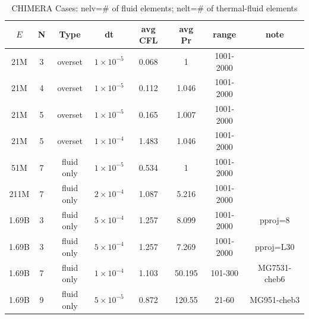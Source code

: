 

\begin{table}
\centering
\caption{CHIMERA Cases: nelv=\# of fluid elements; nelt=\# of thermal-fluid elements}
\begin{tabular}{|c|c|c|c|c|c|c|c|}
\hline
\textbf{$E$} & \textbf{N} & \textbf{Type} & \textbf{dt} & \textbf{avg CFL} & \textbf{avg Pr} & \textbf{range} & \textbf{note} \\
\hline
  21M & 3 & overset & $1 \times 10^{-5}$ & 0.068 & 1 & 1001-2000 & \\ \hline
  21M & 4 & overset & $1 \times 10^{-5}$ & 0.112 & 1.046 & 1001-2000 & \\ \hline
  21M & 5 & overset & $1 \times 10^{-5}$ & 0.165 & 1.007 & 1001-2000 & \\ \hline
  21M & 5 & overset & $1 \times 10^{-4}$ & 1.483 & 1.046 & 1001-2000 & \\ \hline
  51M & 7 & fluid only & $1 \times 10^{-5}$ & 0.534 & 1 & 1001-2000 & \\ \hline
 211M & 7 & fluid only & $2 \times 10^{-4}$ & 1.087 & 5.216 & 1001-2000 & \\ \hline
1.69B & 3 & fluid only & $5 \times 10^{-4}$ & 1.257 & 8.099 & 1001-2000 & pproj=8 \\ \hline
1.69B & 3 & fluid only & $5 \times 10^{-4}$ & 1.257 & 7.269 & 1001-2000 & pproj=L30 \\ \hline
1.69B & 7 & fluid only & $1 \times 10^{-4}$ & 1.103 & 50.195 & 101-300 & MG7531-cheb6 \\ \hline
1.69B & 9 & fluid only & $5 \times 10^{-5}$ & 0.872 & 120.55 & 21-60 & MG951-cheb3 \\ \hline
\end{tabular}
\label{tab:neknek2}
\end{table}

